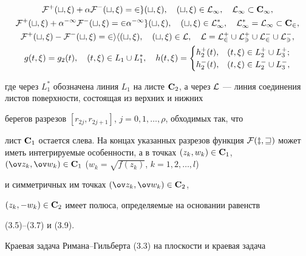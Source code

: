 \begin{gather} 


\cal F^+(t,\xi)+\alpha\cal F^-(t,\xi)=2g(t,\xi),\quad 


(t,\xi)\in L_1,\quad L_1\subset\bold C_1,\notag \\ 


\cal F^+(t,\xi)+\alpha^{-1}\cal F^-(t,\xi)=2\alpha^{-1}g(t,\xi), 


\quad (t,\xi)\in L^*_1,\quad L^*_1=L_1\subset\bold C_2,\\ 


\cal F^+(t,\xi)-\cal F^-(t,\xi)=2ih(t,\xi),\quad 


(t,\xi)\in\cal L,\quad \cal L=L^+_2\cup L^+_3\cup L^-_2\cup 


L^-_3,\notag \\ 


g(t,\xi)=g_2(t),\quad (t,\xi)\in L_1\cup L^*_1,\quad h(t,\xi)= 


\begin{cases} 


h^+_2(t), & (t,\xi)\in L^+_2\cup L^+_3;\\ 


h^-_2(t), & (t,\xi)\in L^-_2\cup L^-_3, 


\end{cases} 


\end{gather} 


где через $L^*_1$ обозначена линия $L_1$ на листе $\bold C_2$, а через $\cal 


L$ --- линия соединения листов поверхности, состоящая из верхних и нижних 


берегов разрезов $[r_{2j},r_{2j+1}]$, $j=0,1,\dotsc,\rho$, обходимых так, что 


лист $\bold C_1$ остается слева. На концах указанных разрезов функция $\cal 


F(z,w)$ может иметь интегрируемые особенности, а в точках $(z_k,w_k)\in\bold 


C_1$, $(\ov z_k,\ov w_k)\in\bold C_1$ ($w_k=\sqrt{f(z_k)}$, $k=1,2,\dotsc,l$) 


и симметричных им точках $(\ov z_k,\ov w_k)\in\bold C_2$, 


$(z_k,-w_k)\in\bold C_2$ имеет полюса, определяемые на основании равенств 


(3.5)--(3.7) и (3.9). 


 


Краевая задача Римана--Гильберта (3.3) на плоскости и краевая задача 


